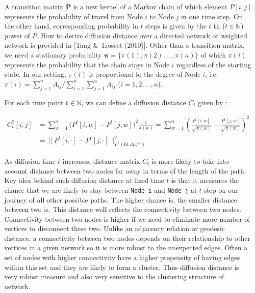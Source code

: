 \documentclass[12pt]{article}
\theoremstyle{definition}
\begin{document}
A transition matrix $\mathbf{P}$ is a new kernel of a Markov chain of which element $P[i,j]$ represents the probability of travel from Node $i$ to Node $j$ in one time step. On the other hand, corresponding probability in $t$ steps is given by the $t$ th ($t \in \mathbb{N}$) power of $P$. How to derive diffusion distance over a directed network or weighted network is provided in [Tang $\&$ Trosset (2010)]. Other than a transition matrix, we need a stationary probability $\boldsymbol{\pi} = \{\pi(1), \pi(2), ... , \pi(n) \}$ of which $\pi(i)$ represents the probability that the chain stays in Node $i$ regardless of the starting state. In our setting, $\pi(i)$ is proportional to the degree of Node $i$, i.e. $\pi(i) = \sum\limits_{j=1}^{n} A_{ij} \big/ \sum\limits_{i=1}^{n}\sum\limits_{j=1}^{n} A_{ij}$ ($i=1,2,..., n$).   

For each time point $t \in \mathbb{N}$, we can define a diffusion distance $C_{t}$  given by :

\begin{equation}
\begin{split}
C^2_{t}[i,j] & = \sum\limits_{w =1}^{n} \big( P^{t}[i,w] - P^{t}[j,w]  \big)^{2} \frac{1}{\pi(w)} = \sum\limits_{w=1}^{n} \left(  \frac{P^{t}[i,w]}{\sqrt{\pi(w)}} - \frac{P^{t}[j,w]}{\sqrt{\pi(w)}}   \right)^2 \\ & = \parallel P^{t}[i, \cdot] - P^{t}[j, \cdot]  \parallel^2_{L^{2}(\boldsymbol{G}, d\mu / \pi)  }
\end{split}
\end{equation}

As diffusion time $t$ increases, distance matrix $C_{t}$ is more likely to take into account distance between two nodes far away in terms of the length of the path. Key idea behind such diffusion distance at fixed time $t$ is that it measures the chance that we are likely to stay between \texttt{Node i} and \texttt{Node j} at $t$ step on our journey of all other possible paths. The higher chance is, the smaller distance between two is. This distance well reflects the connectivity between two nodes. Connectivity between two nodes is higher if we need to eliminate more number of vertices to disconnect these two. Unlike an adjacency relation or geodesic distance, a connectivity between two nodes depends on their relationship to other vertices in a given network so it is more robust to the unexpected edges. Often a set of nodes with higher connectivity have a higher propensity of having edges within this set and they are likely to form a cluster. Thus diffusion distance is very robust measure and also very sensitive to the clustering structure of network. 
\end{document}
